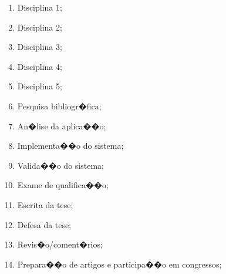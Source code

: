 \documentclass[a4paper,11pt,oneside]{article}
\begin{document}
	\begin{enumerate}
		\item Disciplina 1; %
		\item Disciplina 2; %
		\item Disciplina 3; %
		\item Disciplina 4; %
		\item Disciplina 5; %
		\item Pesquisa bibliogr�fica; %
		\item An�lise da aplica��o; %
		\item Implementa��o do sistema; %
		\item Valida��o do sistema; %
		\item Exame de qualifica��o; %
		\item Escrita da tese; %
		\item Defesa da tese; %
		\item Revis�o/coment�rios; %
		\item Prepara��o de artigos e participa��o em congressos; %
	\end{enumerate}

	\newpage
	\nocite{*}
        \printbibliography


\end{document}
